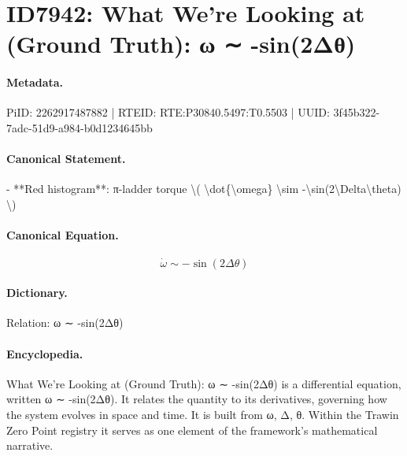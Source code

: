 \section*{ID7942: What We’re Looking at (Ground Truth): ω ∼ -sin(2Δθ)}
\paragraph{Metadata.}
PiID: 2262917487882 | RTEID: RTE:P30840.5497:T0.5503 | UUID: 3f45b322-7adc-51d9-a984-b0d1234645bb

\paragraph{Canonical Statement.}
- **Red histogram**: π-ladder torque \textbackslash{}( \textbackslash{}dot\{\textbackslash{}omega\} \textbackslash{}sim -\textbackslash{}sin(2\textbackslash{}Delta\textbackslash{}theta) \textbackslash{})

\paragraph{Canonical Equation.}
\[
\dot{\omega} \sim -\sin(2\Delta\theta)
\]

\paragraph{Dictionary.}
Relation: ω ∼ -sin(2Δθ)

\paragraph{Encyclopedia.}
What We’re Looking at (Ground Truth): ω ∼ -sin(2Δθ) is a differential equation, written ω ∼ -sin(2Δθ). It relates the quantity to its derivatives, governing how the system evolves in space and time. It is built from ω, Δ, θ. Within the Trawin Zero Point registry it serves as one element of the framework's mathematical narrative.

